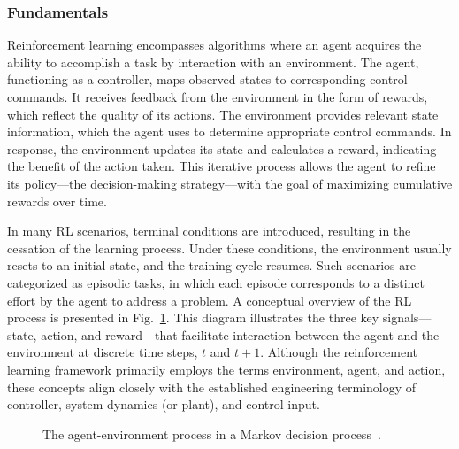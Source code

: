 \documentclass[conference]{IEEEtran}
\begin{document}
\subsubsection{Fundamentals}
Reinforcement learning encompasses algorithms where an agent acquires the ability to accomplish a task by interaction with an environment. The agent, functioning as a controller, maps observed states to corresponding control commands.
It receives feedback from the environment in the form of rewards, which reflect the quality of its actions. The environment provides relevant state information, which the agent uses to determine appropriate control commands. In response, the environment updates its state and calculates a reward, indicating the benefit of the action taken. This iterative process allows the agent to refine its policy—the decision-making strategy—with the goal of maximizing cumulative rewards over time.

In many RL scenarios, terminal conditions are introduced, resulting in the cessation of the learning process. Under these conditions, the environment usually resets to an initial state, and the training cycle resumes. Such scenarios are categorized as episodic tasks, in which each episode corresponds to a distinct effort by the agent to address a problem.
A conceptual overview  of the RL process is presented in Fig.~\ref{fig:agent_env}. This diagram illustrates the three key signals---state, action, and reward---that facilitate interaction between the agent and the environment at discrete time steps, \( t \) and \( t+1 \). Although the reinforcement learning framework primarily employs the terms environment, agent, and action, these concepts align closely with the established engineering terminology of controller, system dynamics (or plant), and control input.
\begin{figure}[H]
	\begin{center}
	\end{center}
	\caption{The agent-environment process in a Markov decision process~\cite{Sutton}.}
	\label{fig:agent_env}
\end{figure}
\end{document}
